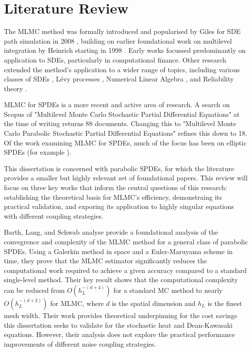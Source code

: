 \section{Literature Review}

The MLMC method was formally introduced and popularised by 
Giles for SDE path simulation in 2008 \cite{giles2008multilevel}, 
building on earlier foundational work on multilevel integration by 
Heinrich starting in 1998 \cite{heinrich1998monte}. Early works focussed 
predominantly on application to SDEs, particularly in computational 
finance. Other research extended the method's application to a wider range 
of topics, including various classes of SDEs \cite{abdulle2013stabilized,
rhee2015unbiased}, Lévy processes \cite{giles2017multilevel}, 
Numerical Linear Algebra \cite{acebron2020probabilistic},
and Reliability theory \cite{aslett2017multilevel}.

MLMC for SPDEs is a more recent and active area of research. 
A search on Scopus \cite{scopus} of "Multilevel Monte Carlo Stochastic
Partial Differential Equations" at the time of writing returns 88 documents. Changing 
this to "Multilevel Monte Carlo Parabolic Stochastic Partial Differential Equations" refines 
this down to 18. Of the work examining MLMC for SPDEs, much of the focus has been on 
elliptic SPDEs (for example \cite{abdulle2013multilevel, kornhuber2014multilevel, luo2019multilevel}).

This dissertation is concerned with parabolic SPDEs, for which the literature 
provides a smaller but highly relevant set of foundational papers. This review will focus on 
three key works that inform the central questions of this research: establishing the theoretical 
basis for MLMC's efficiency, demonstraing its practical validation, and exporing 
its application to highly singular equations with different coupling strategies. 


Barth, Lang, and Schwab \cite{barth2013multilevel} analyse provide a foundational 
analysis of the convegrence and complexity of the MLMC method for a general class of 
parabolic SPDEs. Using a Galerkin method in space and a Euler-Maruyama scheme in time, they 
prove that the  MLMC estimator significantly reduces the computational work required 
to achieve a given accuracy compared to a standard single-level method. Their 
key result shows that the computational complexity can be reduced from $O(h_L^{-(d+4)})$
for a standard MC method to nearly $O(h_L^{-(d+2)})$ for MLMC, where $d$ is the 
spatial dimension and $h_L$ is the finest mesh width. Their work provides 
theoretical underpinning for the cost savings this dissertation seeks to validate for 
the stochastic heat and Dean-Kawasaki equations. However, their analysis does not explore
the practical performance improvements of different noise coupling strategies.

